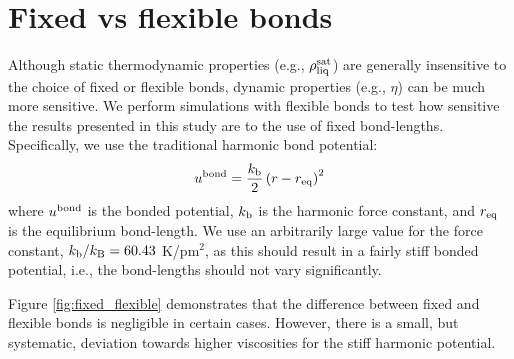 \documentclass[preprint,review,11pt]{elsarticle}
\begin{document}
	\newpage
	
	\section{Fixed vs flexible bonds} \label{fixed flexible}
	
	
    Although static thermodynamic properties (e.g., $\rho_{\rm liq}^{\rm sat}$) are generally insensitive to the choice of fixed or flexible bonds, dynamic properties (e.g., $\eta$) can be much more sensitive. We perform simulations with flexible bonds to test how sensitive the results presented in this study are to the use of fixed bond-lengths. Specifically, we use the traditional harmonic bond potential:
    \begin{equation} \label{eq:harmonic_bond}
    u^{\rm bond} = \frac{k_{\rm b}}{2} \left(r-r_{\rm eq}\right)^2
    \end{equation}
    where $u^{\rm bond}$ is the bonded potential, $k_{\rm b}$ is the harmonic force constant, and $r_{\rm eq}$ is the equilibrium bond-length. We use an arbitrarily large value for the force constant, $k_{\rm b}/k_{\rm B} = 60.43$ K/pm$^2$, as this should result in a fairly stiff bonded potential, i.e., the bond-lengths should not vary significantly.
    
    
    Figure \ref{fig:fixed_flexible} demonstrates that the difference between fixed and flexible bonds is negligible in certain cases. However, there is a small, but systematic, deviation towards higher viscosities for the stiff harmonic potential. 
    
\end{document}
